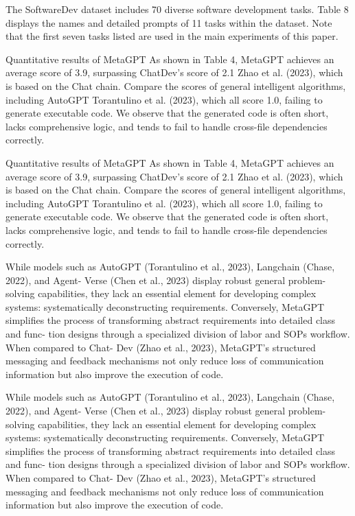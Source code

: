 \documentclass[12pt]{article}
\begin{document}
The SoftwareDev dataset includes 70 diverse software development tasks. Table 8 displays the
names and detailed prompts of 11 tasks within the dataset. Note that the first seven tasks listed are
used in the main experiments of this paper.


Quantitative results of MetaGPT As shown in Table 4, MetaGPT achieves an average score
of 3.9, surpassing ChatDev’s score of 2.1 Zhao et al. (2023), which is based on the Chat chain.
Compare the scores of general intelligent algorithms, including AutoGPT Torantulino et al. (2023),
which all score 1.0, failing to generate executable code. We observe that the generated code is often
short, lacks comprehensive logic, and tends to fail to handle cross-file dependencies correctly.


Quantitative results of MetaGPT As shown in Table 4, MetaGPT achieves an average score
of 3.9, surpassing ChatDev’s score of 2.1 Zhao et al. (2023), which is based on the Chat chain.
Compare the scores of general intelligent algorithms, including AutoGPT Torantulino et al. (2023),
which all score 1.0, failing to generate executable code. We observe that the generated code is often
short, lacks comprehensive logic, and tends to fail to handle cross-file dependencies correctly.


While models such as AutoGPT (Torantulino et al., 2023), Langchain (Chase, 2022), and Agent-
Verse (Chen et al., 2023) display robust general problem-solving capabilities, they lack an essential
element for developing complex systems: systematically deconstructing requirements. Conversely,
MetaGPT simplifies the process of transforming abstract requirements into detailed class and func-
tion designs through a specialized division of labor and SOPs workflow. When compared to Chat-
Dev (Zhao et al., 2023), MetaGPT’s structured messaging and feedback mechanisms not only reduce
loss of communication information but also improve the execution of code.


While models such as AutoGPT (Torantulino et al., 2023), Langchain (Chase, 2022), and Agent-
Verse (Chen et al., 2023) display robust general problem-solving capabilities, they lack an essential
element for developing complex systems: systematically deconstructing requirements. Conversely,
MetaGPT simplifies the process of transforming abstract requirements into detailed class and func-
tion designs through a specialized division of labor and SOPs workflow. When compared to Chat-
Dev (Zhao et al., 2023), MetaGPT’s structured messaging and feedback mechanisms not only reduce
loss of communication information but also improve the execution of code.
\end{document}

